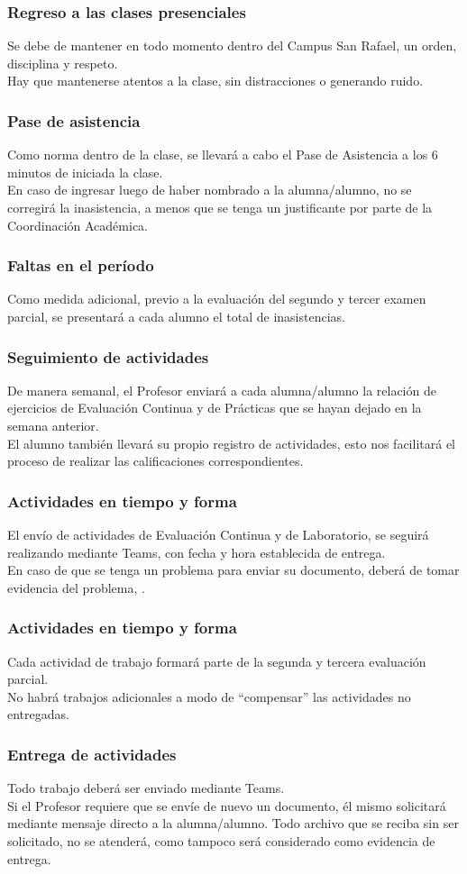 \documentclass[14pt]{beamer}
\begin{document}
\begin{frame}
\frametitle{Regreso a las clases presenciales}
Se debe de mantener en todo momento dentro del Campus San Rafael, un orden, disciplina y respeto.
\\
\bigskip
\pause
Hay que mantenerse atentos a la clase, sin distracciones o generando ruido.
\end{frame}
\begin{frame}
\frametitle{Pase de asistencia}
Como norma dentro de la clase, se llevará a cabo el Pase de Asistencia a los 6 minutos de iniciada la clase.
\\
\bigskip
\pause
En caso de ingresar luego de haber nombrado a la alumna/alumno, no se corregirá la inasistencia, a menos que se tenga un justificante por parte de la Coordinación Académica.
\end{frame}
\begin{frame}
\frametitle{Faltas en el período}
Como medida adicional, previo a la evaluación del segundo y tercer examen parcial, se presentará a cada alumno el total de inasistencias.
\end{frame}
\begin{frame}
\frametitle{Seguimiento de actividades}
De manera semanal, el Profesor enviará a cada alumna/alumno la relación de ejercicios de Evaluación Continua y de Prácticas que se hayan dejado en la semana anterior.
\\
\bigskip
\pause
El alumno también llevará su propio registro de actividades, esto nos facilitará el proceso de realizar las calificaciones correspondientes.
\end{frame}
\begin{frame}
\frametitle{Actividades en tiempo y forma}
El envío de actividades de Evaluación Continua y de Laboratorio, se seguirá realizando mediante Teams, con fecha y hora establecida de entrega.
\\
\bigskip
\pause
En caso de que se tenga un problema para enviar su documento, deberá de tomar evidencia del problema, .
\end{frame}
\begin{frame}
\frametitle{Actividades en tiempo y forma}
Cada actividad de trabajo formará parte de la segunda y tercera evaluación parcial.
\\
\bigskip
\pause
No habrá trabajos adicionales a modo de \enquote{compensar} las actividades no entregadas.
\end{frame}
\begin{frame}
\frametitle{Entrega de actividades}
Todo trabajo deberá ser enviado mediante Teams.
\\
\bigskip
\pause
Si el Profesor requiere que se envíe de nuevo un documento, él mismo solicitará mediante mensaje directo a la alumna/alumno. \pause Todo archivo que se reciba sin ser solicitado, no se atenderá, como tampoco será considerado como evidencia de entrega.
\end{frame}
\end{document}
